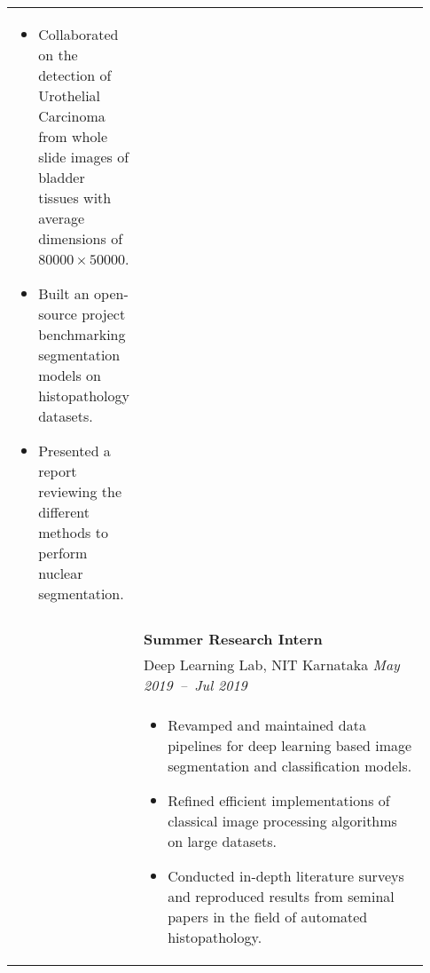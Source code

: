 \documentclass[letterpaper, 10pt, oneside]{article}
\newcommand{\bdit}[1]{{\textbf{#1}}}
\begin{document}
\begin{longtable}{@{} p{0.13\linewidth} p{0.8\linewidth}}
{\begin{itemize}[leftmargin=*, itemsep=-0.88ex, topsep=-0.88ex]
            \item Collaborated on the detection of Urothelial Carcinoma from whole slide images of bladder tissues with average dimensions of $80000\times50000$.
            \item Built an open-source project benchmarking segmentation models on histopathology datasets.
            \item Presented a report reviewing the different methods to perform nuclear segmentation.
        \end{itemize}
    }
    \\
    \\
                         & \bdit{Summer Research Intern}                                                                                                                                             \\
                         & Deep Learning Lab, NIT Karnataka \hfill \hspace{-3em} \textsl{May 2019\ --\ Jul 2019}                                                                                     \\
                         & \parbox{0.8\textwidth}{                                                                                                                                                   %
        \begin{itemize}[leftmargin=*, itemsep=-0.88ex, topsep=-0.88ex]
            \item Revamped and maintained data pipelines for deep learning based image segmentation and classification models.
            \item Refined efficient implementations of classical image processing algorithms on large datasets.
            \item Conducted in-depth literature surveys and reproduced results from seminal papers in the field of automated histopathology.
        \end{itemize}
    }
    \\
    \\


\end{longtable}
\end{document}
